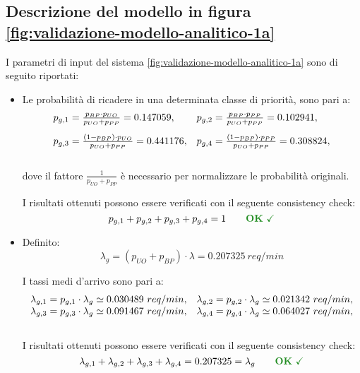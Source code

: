 \subsection{Descrizione del modello in figura \ref{fig:validazione-modello-analitico-1a}}
I parametri di input del sistema \ref{fig:validazione-modello-analitico-1a} sono di seguito riportati:
\begin{itemize}
\item Le probabilità di ricadere in una determinata classe di priorità, sono pari a:
\begin{equation}
\begin{array}{l l}
p_{g,1} = \frac{p_{BP} \cdot p_{UO}}{p_{UO} + p_{PP}} = 0.147059, & p_{g,2} = \frac{p_{BP} \cdot p_{PP}}{p_{UO} + p_{PP}} = 0.102941, \\[1em]
p_{g,3} = \frac{(1-p_{BP}) \cdot p_{UO}}{p_{UO} + p_{PP}} = 0.441176, & p_{g,4} = \frac{(1-p_{BP}) \cdot p_{PP}}{p_{UO} + p_{PP}} = 0.308824, \\[1.5em]
\end{array}
\end{equation}
dove il fattore $\frac{1}{p_{UO} + p_{PP}}$ è necessario per normalizzare le probabilità originali.

I risultati ottenuti possono essere verificati con il seguente consistency check:
\begin{equation}
p_{g,1} + p_{g,2} + p_{g,3} + p_{g,4} = 1 \qquad \text{\color{forestgreen}\textbf{OK} \checkmark}
\end{equation}
\item Definito:
\begin{equation}
\lambda_g = (p_{UO} + p_{BP})\cdot \lambda = 0.207325\ req/min
\end{equation} 

I tassi medi d'arrivo sono pari a:
\begin{equation}
\begin{array}{l l}
\lambda_{g,1} = p_{g,1} \cdot \lambda_g \simeq 0.030489\ req/min, & \lambda_{g,2} = p_{g,2} \cdot \lambda_g \simeq 0.021342\ req/min, \\
\lambda_{g,3} = p_{g,3} \cdot \lambda_g \simeq 0.091467\ req/min, & \lambda_{g,4} = p_{g,4} \cdot \lambda_g \simeq 0.064027\ req/min, \\[1em]
\end{array}
\end{equation}

I risultati ottenuti possono essere verificati con il seguente consistency check:
\begin{equation}
\lambda_{g,1} + \lambda_{g,2} + \lambda_{g,3} + \lambda_{g,4} = 0.207325 = \lambda_g \qquad \text{\color{forestgreen}\textbf{OK} \checkmark} \\
\end{equation}


\end{itemize}

